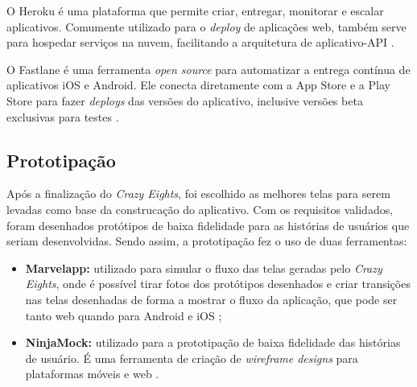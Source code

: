 O Heroku é uma plataforma que permite criar, entregar, monitorar e escalar aplicativos. Comumente utilizado para o \textit{deploy} de aplicações web, também serve para hospedar serviços na nuvem, facilitando a arquitetura de aplicativo-API \cite{heroku}.

O Fastlane é uma ferramenta \textit{open source} para automatizar a entrega contínua de aplicativos iOS e Android. Ele conecta diretamente com a App Store e a Play Store para fazer \textit{deploys} das versões do aplicativo, inclusive versões beta exclusivas para testes \cite{fastlane}.

\subsection{Prototipação}

Após a finalização do \textit{Crazy Eights}, foi escolhido as melhores telas para serem levadas como base da construcação do aplicativo.
Com os requisitos validados, foram desenhados protótipos de baixa fidelidade para as histórias de usuários que seriam desenvolvidas.
Sendo assim, a prototipação fez o uso de duas ferramentas:
\begin{itemize}
    \item \textbf{Marvelapp:} utilizado para simular o fluxo das telas geradas pelo \textit{Crazy Eights}, onde é possível tirar fotos dos protótipos desenhados e criar transições nas telas desenhadas de forma a mostrar o fluxo da aplicação, que pode ser tanto web quando para Android e iOS \cite{marvelapp};
    \item \textbf{NinjaMock:} utilizado para a prototipação de baixa fidelidade das histórias de usuário. É uma ferramenta de criação de \textit{wireframe designs} para plataformas móveis e web \cite{ninjamock}.
\end{itemize}

